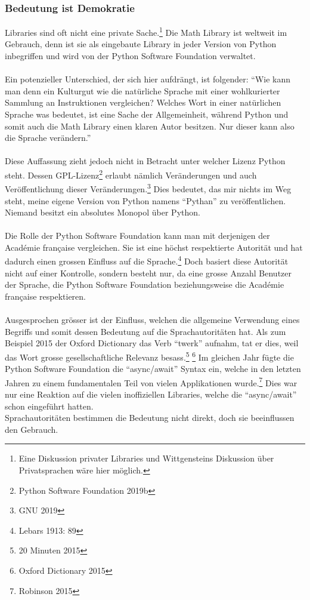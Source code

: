 \documentclass[10pt,a4paper]{article}
\begin{document}
\subsubsection{Bedeutung ist Demokratie}
Libraries sind oft nicht eine private Sache.\footnote{Eine Diskussion privater Libraries und Wittgensteins Diskussion über Privatsprachen wäre hier möglich.} Die Math Library ist weltweit im Gebrauch, denn ist sie als eingebaute Library in jeder Version von Python inbegriffen und wird von der Python Software Foundation verwaltet. \\
\\
Ein potenzieller Unterschied, der sich hier aufdrängt, ist folgender: \enquote{Wie kann man denn ein Kulturgut wie die natürliche Sprache mit einer wohlkurierter Sammlung an Instruktionen vergleichen? Welches Wort in einer natürlichen Sprache was bedeutet, ist eine Sache der Allgemeinheit, während Python und somit auch die Math Library einen klaren Autor besitzen. Nur dieser kann also die Sprache verändern.} \\
\\
Diese Auffassung zieht jedoch nicht in Betracht unter welcher Lizenz Python steht. Dessen GPL-Lizenz\footnote{Python Software Foundation 2019b} erlaubt nämlich Veränderungen und auch Veröffentlichung dieser Veränderungen.\footnote{GNU 2019} Dies bedeutet, das mir nichts im Weg steht, meine eigene Version von Python namens \enquote{Pythan} zu veröffentlichen. Niemand besitzt ein absolutes Monopol über Python. \\
\\
Die Rolle der Python Software Foundation kann man mit derjenigen der Académie française vergleichen. Sie ist eine höchst respektierte Autorität und hat dadurch einen grossen Einfluss auf die Sprache.\footnote{Lebars 1913: 89} Doch basiert diese Autorität nicht auf einer Kontrolle, sondern besteht nur, da eine grosse Anzahl Benutzer der Sprache, die Python Software Foundation beziehungsweise die Académie française respektieren. \\
\\
Ausgesprochen grösser ist der Einfluss, welchen die allgemeine Verwendung eines Begriffs und somit dessen Bedeutung auf die Sprachautoritäten hat. Als zum Beispiel 2015 der Oxford Dictionary das Verb \enquote{twerk} aufnahm, tat er dies, weil das Wort grosse gesellschaftliche Relevanz besass.\footnote{20 Minuten 2015} \footnote{Oxford Dictionary 2015} Im gleichen Jahr fügte die Python Software Foundation die \enquote{async/await} Syntax ein, welche in den letzten Jahren zu einem fundamentalen Teil von vielen Applikationen wurde.\footnote{Robinson 2015} Dies war nur eine Reaktion auf die vielen inoffiziellen Libraries, welche die \enquote{async/await} schon eingeführt hatten. \\
Sprachautoritäten bestimmen die Bedeutung nicht direkt, doch sie beeinflussen den Gebrauch.
\end{document}
